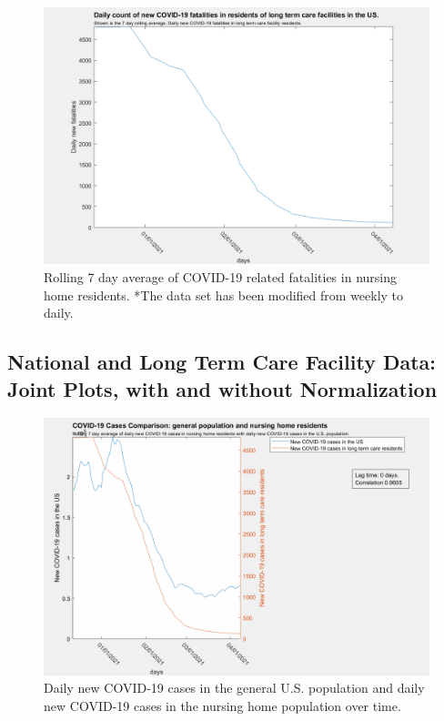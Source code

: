 \documentclass[twoside]{article}
\begin{document}
\begin{multicols}{2}
\begin{figure}[H]
	\includegraphics[width=\linewidth]{images/usa_daily_ltc_fatalities_processed.png}
	\caption{Rolling 7 day average of COVID-19 related fatalities in nursing home residents. *The data set has been modified from weekly to daily.}
	\label{fig:images/usa_daily_ltc_fatalities_processedLabel}
\end{figure}

\subsection{National and Long Term Care Facility Data: Joint Plots, with and without Normalization}


\begin{figure}[H]
	\includegraphics[width=\linewidth]{images/usa_nursing_cases-0lag.png}
	\caption{Daily new COVID-19 cases in the general U.S. population and daily new COVID-19 cases in the nursing home population over time. }
	\label{fig:images/usa_nursing_cases-0lagLabel}
\end{figure}


\end{multicols}
\end{document}
